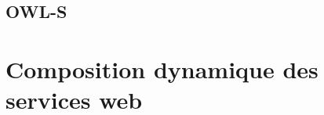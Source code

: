 


    \newpage
    \subsection{OWL-S}
    \label{sec:owl-s}
    \cite{mcilraith2003bringing}
    
    

  \section{Composition dynamique des services web}
  \label{sec:comp-dynam}


